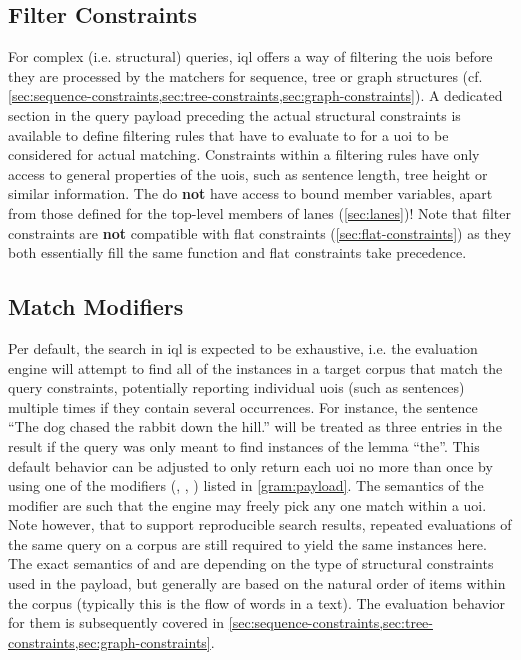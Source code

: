 \documentclass[11pt,a4paper]{report}
\begin{document}
\subsection{Filter Constraints}
\label{sec:filter-constraints}
\noindent For complex (i.e. structural) queries, \ac{iql} offers a way of filtering the \acp{uoi} before they are processed by the matchers for sequence, tree or graph structures (cf. \cref{sec:sequence-constraints,sec:tree-constraints,sec:graph-constraints}).
A dedicated  section in the query payload preceding the actual structural constraints is available to define filtering rules that have to evaluate to  for a \ac{uoi} to be considered for actual matching.
Constraints within a filtering rules have only access to general properties of the \acp{uoi}, such as sentence length, tree height or similar information.
The do \textbf{not} have access to bound member variables, apart from those defined for the top-level members of lanes (\ref{sec:lanes})!
Note that filter constraints are \textbf{not} compatible with flat constraints (\ref{sec:flat-constraints}) as they both essentially fill the same function and flat constraints take precedence.

\subsection{Match Modifiers}
\label{sec:match-modifiers}
Per default, the search in \ac{iql} is expected to be exhaustive, i.e. the evaluation engine will attempt to find all of the instances in a target corpus that match the query constraints, potentially reporting individual \acp{uoi} (such as sentences) multiple times  if they contain several occurrences.
For instance, the sentence ``The dog chased the rabbit down the hill.'' will be treated as three entries in the result if the query was only meant to find instances of the lemma ``the''.
This default behavior can be adjusted to only return each \ac{uoi} no more than once by using one of the modifiers (, , ) listed in \cref{gram:payload}.
The semantics of the  modifier are such that the engine may freely pick any one match within a \ac{uoi}.
Note however, that to support reproducible search results, repeated evaluations of the same query on a corpus are still required to yield the same instances here.
The exact semantics of  and  are depending on the type of structural constraints used in the payload, but generally are based on the natural order of items within the corpus (typically this is the flow of words in a text).
The evaluation behavior for them is subsequently covered in \cref{sec:sequence-constraints,sec:tree-constraints,sec:graph-constraints}.
\end{document}
